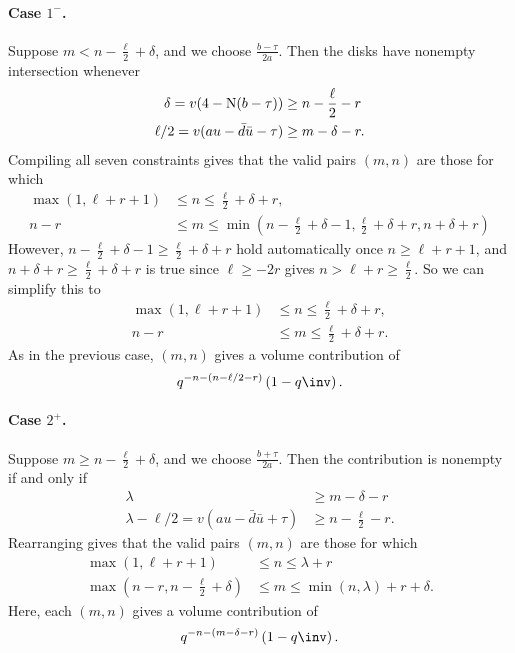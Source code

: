 \paragraph{Case $1^-$.}
Suppose $m < n - \frac{\ell}{2} + \delta$, and we choose $\frac{b-\tau}{2a}$.
Then the disks have nonempty intersection whenever
\begin{align*}
  \delta = v(4-\operatorname{N}(b-\tau)) &\geq n - \frac{\ell}{2} - r \\
  \ell/2 = v(au-\bar d \bar u - \tau) & \geq m - \delta - r.
\end{align*}
Compiling all seven constraints gives that the valid pairs $(m,n)$ are those for which
\begin{align*}
  \max(1, \ell+r+1) &\leq n \leq \frac{\ell}{2}+\delta+r, \\
  n-r &\leq m \leq \min\left( n - \frac{\ell}{2}+\delta - 1,
    \frac{\ell}{2} + \delta + r, n + \delta + r \right)
\end{align*}
However, $n - \frac{\ell}{2}+\delta - 1 \ge \frac{\ell}{2} + \delta + r$
hold automatically once $n \ge \ell + r + 1$,
and $n + \delta + r \ge \frac{\ell}{2} + \delta + r$ is true since
$\ell \ge -2r$ gives $n > \ell + r \ge \frac{\ell}{2}$.
So we can simplify this to
\begin{equation}
  \begin{aligned}
    \max(1, \ell+r+1) &\leq n \leq \frac{\ell}{2}+\delta+r, \\
    n-r &\leq m \leq \frac{\ell}{2} + \delta + r.
  \end{aligned}
  \label{eq:even_case1_minus}
\end{equation}
As in the previous case, $(m,n)$ gives a volume contribution of
\[ q^{-n - (n - \ell/2 - r)} \left( 1 - q\inv \right). \]

\paragraph{Case $2^+$.}
Suppose $m \ge n - \frac{\ell}{2} + \delta$, and we choose $\frac{b+\tau}{2a}$.
Then the contribution is nonempty if and only if
\begin{align*}
  \lambda &\geq m - \delta - r \\
  \lambda - \ell/2 = v(au-\bar d \bar u + \tau) & \geq n - \frac{\ell}{2} - r.
\end{align*}
Rearranging gives that the valid pairs $(m,n)$ are those for which
\begin{equation}
  \begin{aligned}
    \max(1, \ell+r+1) &\leq n \leq \lambda + r \\
    \max\left( n-r, n - \frac{\ell}{2} + \delta \right) &\leq m \leq \min(n, \lambda) + r + \delta.
  \end{aligned}
  \label{eq:even_case2_plus}
\end{equation}
Here, each $(m,n)$ gives a volume contribution of
\[ q^{-n - (m - \delta - r)} \left( 1 - q\inv \right). \]

